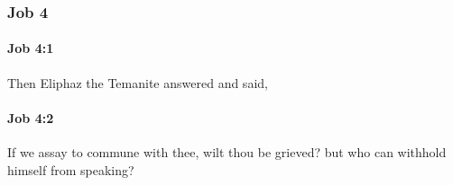	\subsubsection{Job 4} %
		\label{JOB-4}

		\paragraph{Job 4:1} %
			\label{JOB-4-1}

			Then Eliphaz the Temanite answered and said,


		\paragraph{Job 4:2} %
			\label{JOB-4-2}

			If we assay to commune with thee, wilt thou be grieved? but who can withhold himself from speaking?

